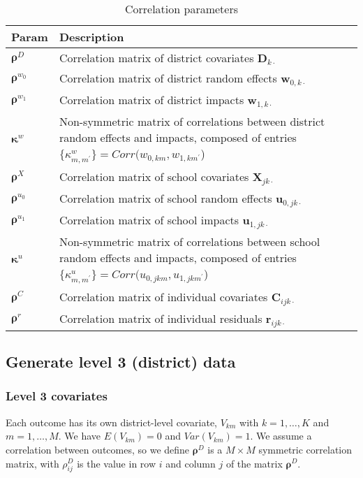 \documentclass[12pt]{article}
\newcommand\mb[1]{\boldsymbol{#1}}
\begin{document}
\begin{table}[ht!]
\begin{tabular}{p{1.5cm} | p{15cm}}
Param											& Description \\ \hline
$\mb{\rho}^D$									& Correlation matrix of district covariates $\mb{D}_{k\cdot}$ \\
$\mb{\rho}^{w_0}$								& Correlation matrix of district random effects $\mb{w}_{0,k\cdot}$ \\
$\mb{\rho}^{w_1}$								& Correlation matrix of district impacts $\mb{w}_{1,k\cdot}$\\
$\boldsymbol{\kappa}^{w}$						& Non-symmetric matrix of correlations between district random effects and impacts, composed of entries $\{\kappa_{m,m^\prime}^{w}\} = Corr(w_{0,km}, w_{1,km^\prime}$) \\ \hline
$\mb{\rho}^X$									& Correlation matrix of school covariates $\mb{X}_{jk\cdot}$\\
$\mb{\rho}^{u_0}$								& Correlation matrix of school random effects $\mb{u}_{0,jk\cdot}$\\
$\mb{\rho}^{u_1}$								& Correlation matrix of school impacts $\mb{u}_{1,jk\cdot}$\\
$\boldsymbol{\kappa}^{u}$						& Non-symmetric matrix of correlations between school random effects and impacts, composed of entries $\{\kappa_{m,m^\prime}^{u}\} = Corr(u_{0,jkm}, u_{1,jkm^\prime}$) \\ \hline
$\mb{\rho}^C$									& Correlation matrix of individual covariates $\mb{C}_{ijk\cdot}$\\
$\mb{\rho}^r$									& Correlation matrix of individual residuals $\mb{r}_{ijk\cdot}$
\end{tabular}
\label{tab:corr_param}
\caption{Correlation parameters}
\end{table}


\subsection{Generate level 3 (district) data}

\subsubsection{Level 3 covariates}

Each outcome has its own district-level covariate, $V_{km}$ with $k = 1, \ldots, K$ and $m = 1, \ldots, M$.
We have $E(V_{km}) = 0$ and $Var(V_{km}) = 1$.
We assume a correlation between outcomes, so we define $\mb{\rho}^D$ is a $M \times M$ symmetric correlation matrix, with $\rho^D_{ij}$ is the value in row $i$ and column $j$ of the matrix $\mb{\rho}^D$.
\end{document}

